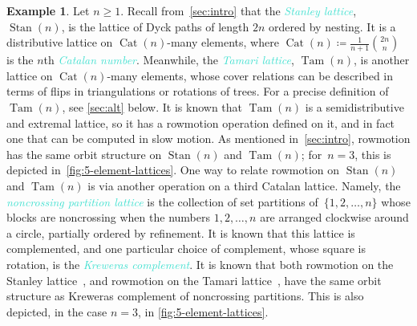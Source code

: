 \documentclass[11pt]{amsart}
\newcommand{\Tam}[1]{\operatorname{Tam}({#1})}
\newcommand{\Stan}[1]{\operatorname{Stan}({#1})}
\DeclareMathOperator{\cat}{Cat}
\newcommand{\dfn}[1]{\textcolor{Turquoise}{\emph{#1}}}
\theoremstyle{definition}
\newtheorem{example}[theorem]{Example}
\begin{document}
\begin{example} \label{ex:stanley_tamari}
Let $n \geq 1$. Recall from~\cref{sec:intro} that the \dfn{Stanley lattice}, $\Stan{n}$, is the lattice of Dyck paths of length $2n$ ordered by nesting. It is a distributive lattice on $\cat(n)$-many elements, where $\cat(n) \coloneqq \frac{1}{n+1}\binom{2n}{n}$ is the $n$th \dfn{Catalan number}. Meanwhile, the \dfn{Tamari lattice}, $\Tam{n}$, is another lattice on $\cat(n)$-many elements, whose cover relations can be described in terms of flips in triangulations or rotations of trees. For a precise definition of $\Tam{n}$, see \cref{sec:alt} below. It is known that $\Tam{n}$ is a semidistributive and extremal lattice, so it has a rowmotion operation defined on it, and in fact one that can be computed in slow motion. As mentioned in~\cref{sec:intro}, rowmotion has the same orbit structure on $\Stan{n}$ and $\Tam{n}$; for~$n=3$, this is depicted in~\cref{fig:5-element-lattices}. One way to relate rowmotion on $\Stan{n}$ and $\Tam{n}$ is via another operation on a third Catalan lattice. Namely, the \dfn{noncrossing partition lattice} is the collection of set partitions of~$\{1,2,\ldots,n\}$ whose blocks are noncrossing when the numbers $1,2,\ldots,n$ are arranged clockwise around a circle, partially ordered by refinement. It is known that this lattice is complemented, and one particular choice of complement, whose square is rotation, is the \dfn{Kreweras complement}. It is known that both rowmotion on the Stanley lattice~\cite{armstrong2013uniform}, and rowmotion on the Tamari lattice~\cite{barnard2019canonical}, have the same orbit structure as Kreweras complement of noncrossing partitions. This is also depicted, in the case $n=3$, in \cref{fig:5-element-lattices}.
\end{example}
\end{document}
